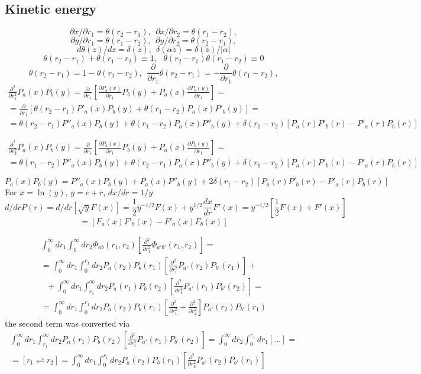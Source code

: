 \documentclass[aip
, pra
, showpacs
, aps
, onecolumn
, groupedaddress
, floatfix
]{revtex4}
\newcommand{\beq}{\begin{equation}}
\newcommand{\eeq}{\end{equation}}
\newcommand{\barr}{\begin{array}}
\newcommand{\earr}{\end{array}}
\begin{document}
\subsection{Kinetic energy}
\beq
\partial x / \partial r_1 = \theta(r_2 - r_1), \ \
\partial x / \partial r_2 = \theta(r_1 - r_2),
\eeq
\beq
\partial y / \partial r_1 = \theta(r_1 - r_2), \ \
\partial y / \partial r_2 = \theta(r_2 - r_1),
\eeq
\beq
d \theta(z) / d z = \delta(z), \ \ \delta(\alpha z) = \delta(z)/ |\alpha|
\eeq
\beq
\theta(r_2-r_1) + \theta(r_1-r_2)\equiv 1,
 \ \ \ \theta(r_2-r_1) \theta(r_1-r_2)\equiv 0
\eeq
\beq
\theta(r_2-r_1)= 1 -\theta(r_1-r_2), \ \
\frac{\partial}{\partial r_1} \theta(r_2-r_1) = -\frac{\partial}{\partial r_1} \theta(r_1-r_2) ,
\eeq
\beq \barr{l}
\frac{\partial^2}{\partial r_1^2} P_a(x) P_b(y)
=\frac{\partial}{\partial r_1} [ \frac{\partial P_a(x)}{\partial r_1} P_b(y)
+ P_a(x) \frac{\partial P_b(y)}{\partial r_1} ] =\\
=\frac{\partial}{\partial r_1} [ \theta(r_2-r_1) P'_a(x) P_b(y)
 + \theta(r_1-r_2) P_a(x) P'_b(y)]=\\
=\theta(r_2-r_1) P''_a(x) P_b(y) + \theta(r_1-r_2) P_a(x) P''_b(y)
+\delta(r_1-r_2) [P_a(r) P'_b(r) - P'_a(r) P_b(r)]
\earr \eeq

\beq \barr{l}
\frac{\partial^2}{\partial r_2^2} P_a(x) P_b(y)
=\frac{\partial}{\partial r_1} [ \frac{\partial P_a(x)}{\partial r_1} P_b(y)
+ P_a(x) \frac{\partial P_b(y)}{\partial r_1} ] =\\
=\theta(r_1-r_2) P''_a(x) P_b(y) + \theta(r_2-r_1) P_a(x) P''_b(y)
+\delta(r_1-r_2) [P_a(r) P'_b(r) - P'_a(r) P_b(r)]
\earr \eeq

\beq
[\frac{\partial^2}{\partial r_1^2} + \frac{\partial^2}{\partial r_2^2}] P_a(x) P_b(y)
= P''_a(x) P_b(y) + P_a(x) P''_b(y)
+ 2 \delta(r_1-r_2) [P_a(r) P'_b(r) - P'_a(r) P_b(r)]
\eeq
For $x=\ln(y)$, $y=c+r$, $dx/dr=1/y$
\beq
d/dr P(r) = d/dr [\sqrt{y} F(x)] = \frac{1}{2} y^{-1/2} F(x) + y^{1/2} \frac{dx}{dr} F'(x) =
y^{-1/2} [\frac{1}{2} F(x) + F'(x)]
\eeq
\beq
[P_a(r) P'_b(r) - P'_a(r) P_b(r)] = [F_a(x) F'_b(x) - F'_a(x) F_b(x)]
\eeq


\beq \barr{l}
\int_0^\infty dr_1 \int_0^\infty dr_2 \Phi_{ab}(r_1, r_2) [\frac{\partial^2}{\partial r_1^2} \Phi_{a'b'}(r_1, r_2)]
=\\
= \int_0^\infty dr_1  \int_0^{r_1} dr_2 P_a(r_2) P_b(r_1) [\frac{\partial^2}{\partial r_1^2} P_{a'}(r_2) P_{b'}(r_1)] +\\
\ \ \ +\int_0^\infty dr_1  \int_{r_1}^\infty dr_2 P_a(r_1) P_b(r_2) [\frac{\partial^2}{\partial r_1^2} P_{a'}(r_1) P_{b'}(r_2)]=\\
= \int_0^\infty dr_1  \int_0^{r_1} dr_2 P_a(r_2) P_b(r_1)
[\frac{\partial^2}{\partial r_1^2} + \frac{\partial^2}{\partial r_2^2} ]
P_{a'}(r_2) P_{b'}(r_1)
\earr \eeq
the second term was converted via
\beq \barr{l}
\int_0^\infty dr_1  \int_{r_1}^\infty dr_2 P_a(r_1) P_b(r_2) [\frac{\partial^2}{\partial r_1^2} P_{a'}(r_1) P_{b'}(r_2)]
= \int_0^\infty dr_2  \int_0^{r_1} dr_1 [...] =\\
= [r_1 \rightleftharpoons r_2]
=\int_0^\infty dr_1  \int_0^{r_1} dr_2 P_a(r_2) P_b(r_1) [\frac{\partial^2}{\partial r_2^2} P_{a'}(r_2) P_{b'}(r_1)]
\earr \eeq
\end{document}
